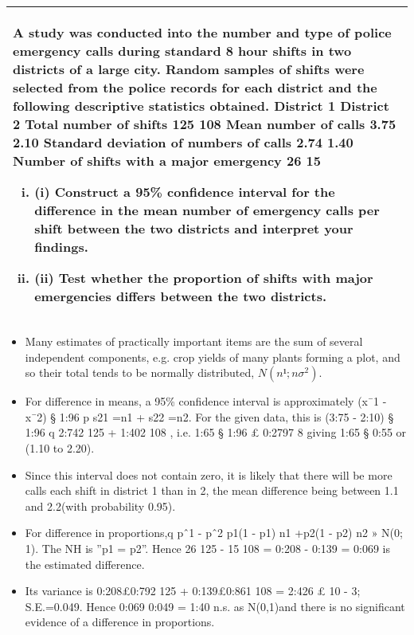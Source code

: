 \documentclass[a4paper,12pt]{article}
\begin{document}

\newpage


\begin{table}[ht!]
 
\centering
 
\begin{tabular}{|p{15cm}|}
 
\hline  
\large
A study was conducted into the number and type of police emergency calls during standard 8 hour shifts in two districts of a large city.  Random samples of shifts were selected from the police records for each district and the following descriptive statistics obtained.
District 1 District 2 Total number of shifts 125 108 Mean number of calls 3.75 2.10 Standard deviation of numbers of calls 2.74 1.40 Number of shifts with a major emergency 26 15

\begin{enumerate}[(i)]
\item (i) Construct a 95\% confidence interval for the difference in the mean number of emergency calls per shift between the two districts and interpret your findings.
\item (ii) Test whether the proportion of shifts with major emergencies differs between the two districts.
\end{enumerate}
\\ \hline
  
\end{tabular}

\end{table}
\large
\begin{itemize}
\item Many estimates of practically important items are the sum of several independent components,
e.g. crop yields of many plants forming a plot, and so their total tends to be normally distributed,
$N(n¹; n\sigma^2)$.


\item For difference in means, a 95\% confidence interval is approximately
(x¯1  -  x¯2) § 1:96
p
s21
=n1 + s22
=n2.
For the given data, this is (3:75  -  2:10) § 1:96
q
2:742
125 + 1:402
108 , i.e. 1:65 § 1:96 £ 0:2797
8
giving 1:65 § 0:55 or (1.10 to 2.20).
\item Since this interval does not contain zero, it is likely that there will be more calls each shift in
district 1 than in 2, the mean difference being between 1.1 and 2.2(with probability 0.95).
\item For difference in proportions,q pˆ1 - pˆ2
p1(1 - p1)
n1
+p2(1 - p2)
n2
» N(0; 1).
The NH is ”p1 = p2”.
Hence 26
125  -  15
108 = 0:208  -  0:139 = 0:069 is the estimated difference.
\item Its variance is 0:208£0:792
125 + 0:139£0:861
108 = 2:426 £ 10 - 3; S.E.=0.049.
Hence 0:069
0:049 = 1:40 n.s. as N(0,1)and there is no significant evidence of a difference in proportions.

\end{itemize}
\end{document}
